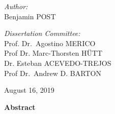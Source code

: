 \begin{titlepage}
\begin{center}
\vspace{3 cm}
\begin{minipage}{0.4\textwidth}
\begin{flushleft} 
\emph{Author:}\\
Benjamin \MakeUppercase{Post}
\end{flushleft}
\end{minipage}
\begin{minipage}{0.4\textwidth}
\begin{flushright} 
\emph{Dissertation Committee:} \\
Prof. Dr.~Agostino \MakeUppercase{Merico}\\
Prof Dr. Marc-Thorsten \MakeUppercase{Hütt}\\
Dr. Esteban \MakeUppercase{Acevedo-Trejos}\\
Prof Dr.~Andrew D. \MakeUppercase{Barton}\\
\end{flushright}
\end{minipage}

\vspace{2cm}

{August 16, 2019 }

\end{center}


\large 
\textbf{Abstract} \\

\normalsize



\end{titlepage}
